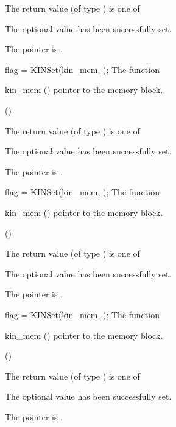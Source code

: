 {
  The return value  (of type ) is one of
  \begin{args}
  \item[\Id{KIN\_SUCCESS}] 
    The optional value has been successfully set.
  \item[\Id{KIN\_MEM\_NULL}]
    The  pointer is .
  \end{args}
}
{}
{
flag = KINSet(kin\_mem, );
}
{
  The function 
}
{
  \begin{args}
  \item[kin\_mem] ()
    pointer to the {\kinsol} memory block.
  \item[] (\id{})

  \end{args}
}
{
  The return value  (of type ) is one of
  \begin{args}
  \item[\Id{KIN\_SUCCESS}] 
    The optional value has been successfully set.
  \item[\Id{KIN\_MEM\_NULL}]
    The  pointer is .
  \end{args}
}
{}
{
flag = KINSet(kin\_mem, );
}
{
  The function 
}
{
  \begin{args}
  \item[kin\_mem] ()
    pointer to the {\kinsol} memory block.
  \item[] (\id{})

  \end{args}
}
{
  The return value  (of type ) is one of
  \begin{args}
  \item[\Id{KIN\_SUCCESS}] 
    The optional value has been successfully set.
  \item[\Id{KIN\_MEM\_NULL}]
    The  pointer is .
  \end{args}
}
{}
{
flag = KINSet(kin\_mem, );
}
{
  The function 
}
{
  \begin{args}
  \item[kin\_mem] ()
    pointer to the {\kinsol} memory block.
  \item[] (\id{})

  \end{args}
}
{
  The return value  (of type ) is one of
  \begin{args}
  \item[\Id{KIN\_SUCCESS}] 
    The optional value has been successfully set.
  \item[\Id{KIN\_MEM\_NULL}]
    The  pointer is .
  \end{args}
}
{}


